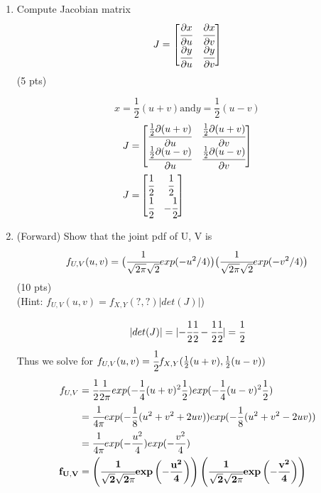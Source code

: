 \documentclass[a4paper]{article}
\theoremstyle{definition}
\newcommand{\abs}[1]{\lvert#1\rvert}
\newenvironment{soln}{
	\leavevmode\color{blue}\ignorespaces
}{}
\begin{document}
	\begin{enumerate}[label=(\alph*)]
		\item Compute Jacobian matrix $$J=\begin{bmatrix}
			\cfrac{\partial x}{\partial u} & \cfrac{\partial x}{\partial v}\\
			\cfrac{\partial y}{\partial u} & \cfrac{\partial y}{\partial v}
		\end{bmatrix}
		$$
		\hfill (5 pts)
		
		\begin{soln}
                $$x=\frac{1}{2}(u+v) \text{and} y=\frac{1}{2}(u-v)$$
                \begin{align*}
                    J =& \begin{bmatrix}
			                 \cfrac{\frac{1}{2}\partial (u+v)}{\partial u} & \cfrac{\frac{1}{2}\partial (u+v)}{\partial v}\\
			                 \cfrac{\frac{1}{2}\partial (u-v)}{\partial u} & \cfrac{\frac{1}{2}\partial (u-v)}{\partial v}
		              \end{bmatrix} \\
                    J =& \begin{bmatrix}
			                 \cfrac{1}{2} & \cfrac{1}{2}\\
			                 \cfrac{1}{2} & -\cfrac{1}{2}
		              \end{bmatrix}
                \end{align*}
            \end{soln}
		
		
		\item (Forward) Show that the joint pdf of U, V is
		$$f_{U, V}(u, v)=\big (\cfrac{1}{\sqrt{2\pi}\sqrt{2}}exp(-u^{2}/4)\big ) \big (\cfrac{1}{\sqrt{2\pi}\sqrt{2}}exp(-v^{2}/4)\big )$$
		\hfill (10 pts) \\
		(Hint: $f_{U, V}(u, v)=f_{X, Y}(?, ?)|det(J)|$) \\
		
		\begin{soln}
                $$\abs{det(J)} = \abs{-\cfrac{1}{2}\cfrac{1}{2}-\cfrac{1}{2}\cfrac{1}{2}} = \cfrac{1}{2}$$
                Thus we solve for $f_{U, V}(u, v)=\cfrac{1}{2}f_{X, Y}(\frac{1}{2}(u+v), \frac{1}{2}(u-v))$
                \begin{align*}
                    f_{U, V} &= \cfrac{1}{2}\frac{1}{2\pi} exp(-\frac{1}{4}(u+v)^{2}\frac{1}{2}) exp(-\frac{1}{4}(u-v)^{2}\frac{1}{2}) \\
                    &= \cfrac{1}{4\pi} exp(-\frac{1}{8}(u^2+v^2+2uv)) exp(-\frac{1}{8}(u^2+v^2-2uv)) \\
                    &= \cfrac{1}{4\pi} exp(-\frac{u^2}{4}) exp(-\frac{v^2}{4}) \\
                    \mathbf{f_{U, V}} &= \mathbf{\left(\cfrac{1}{\sqrt{2}\sqrt{2\pi}}exp\left(-\frac{u^2}{4}\right)\right) \left(\cfrac{1}{\sqrt{2}\sqrt{2\pi}}exp\left(-\frac{v^2}{4}\right)\right)}
                \end{align*}
            \end{soln}
		

\end{enumerate}
\end{document}
